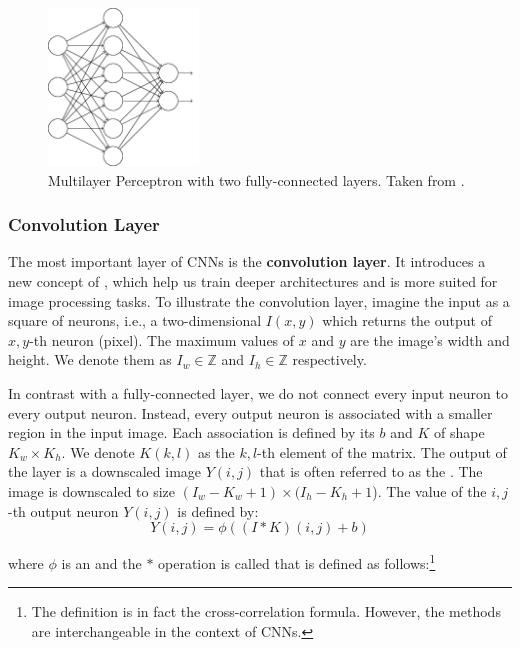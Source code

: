 \begin{figure}[h]
    \centering
    \includegraphics[width=4cm]{Sources/Figures/fully_connected_layer.png}
    \caption{Multilayer Perceptron with two fully-connected layers. Taken from
        \cite{nielsenneural}.}
    \label{fig:fcl}
\end{figure}

\subsubsection{Convolution Layer}

The most important layer of CNNs is the \textbf{convolution layer}. It
introduces a new concept of , which help us train deeper
architectures and is more suited for image processing tasks. To illustrate the
convolution layer, imagine the input as a square of neurons, i.e., a
two-dimensional  $I(x,y)$ which returns the output of $x,y$-th neuron
(pixel). The maximum values of $x$ and $y$ are the image's width and height.
We denote them as $I_w \in \mathds{Z}$ and $I_h \in \mathds{Z}$ respectively.


In contrast with a fully-connected layer, we do not connect every input neuron
to every output neuron. Instead, every output neuron is associated with a
smaller region in the input image. Each association is defined by its
 $b$ and  $K$ of shape $K_w \times K_h$.
We denote $K(k, l)$ as the $k,l$-th element of the matrix. The output of the layer
is a downscaled image $Y(i,j)$ that is often referred to as the .
The image is downscaled to size $(I_w - K_w + 1) \times (I_h - K_h + 1$).
The value of the $i, j$-th output neuron $Y(i,j)$ is defined by:
$$
    Y(i, j) = \phi\left((I * K)(i,j) + b\right)
$$

where $\phi$ is an  and the $*$ operation is called 
that is defined as follows:\footnote{The definition is in fact the cross-correlation formula.
    However, the methods are interchangeable in the context of CNNs.}

